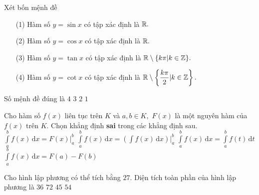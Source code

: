 \begin{ex}%
Xét bốn mệnh đề
\begin{itemize}
\item [(1)] Hàm số $y=\sin x  $ có tập xác định là $ \Bbb{R}. $
\item [(2)] Hàm số $y=\cos x  $ có tập xác định là $ \Bbb{R}. $
\item [(3)] Hàm số $y=\tan x  $ có tập xác định là $ \Bbb{R}\setminus\{k\pi|k\in \Bbb{Z}\}. $
\item [(4)] Hàm số $y=\cot x  $ có tập xác định là $ \Bbb{R}\setminus\left\{\dfrac{k\pi}{2}|k\in \Bbb{Z}\right\}. $
\end{itemize}
Số mệnh đề đúng là
\choice
{$ 4 $}
{$ 3 $}
{\True $ 2 $}
{$ 1 $}
\end{ex}

\begin{ex}%
Cho hàm số $ f(x) $ liên tục trên $ K $ và $ a, b\in K,$  $F(x) $ là một nguyên hàm của $ f(x) $ trên $ K. $ Chọn khẳng
định {\bf sai} trong các khẳng định sau.
\choice
{$ \displaystyle\int\limits_a^b f(x)\mathrm{\, d}x=F(x)\Big|_a^b $}
{$ \displaystyle\int\limits_a^b f(x)\mathrm{\, d}x=\left(\displaystyle\int f(x)\mathrm{\, d}x\right)\Big|_a^b $}
{$  \displaystyle\int\limits_a^b f(x)\mathrm{\, d}x= \displaystyle\int\limits_a^b f(t)\mathrm{\, d}t $}
{\True $  \displaystyle\int\limits_a^b f(x)\mathrm{\, d}x=F(a)-F(b) $}
\end{ex}

\begin{ex}%
Cho hình lập phương có thể tích bằng $ 27. $ Diện tích toàn phần của hình lập phương là
\choice
{$ 36 $}
{$ 72 $}
{$ 45 $}
{\True $ 54 $}
\end{ex}

